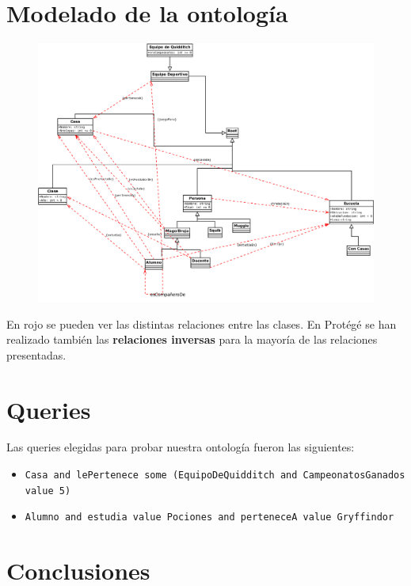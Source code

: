 \documentclass[11pt]{article}
\begin{document}
\newpage

\section{Modelado de la ontología}

\begin{figure}[h!]
    \begin{center}
      \includegraphics[width=\linewidth]{harrypotter.png}
    \end{center}
  \end{figure}

En rojo se pueden ver las distintas relaciones entre las clases. En Protégé se 
han realizado también las \textbf{relaciones inversas} para la mayoría de las 
relaciones presentadas.

\section{Queries}

Las queries elegidas para probar nuestra ontología fueron las siguientes:

\begin{itemize}
    \item \texttt{Casa and lePertenece some (EquipoDeQuidditch and CampeonatosGanados value 5)}
    \item \texttt{Alumno and estudia value Pociones and perteneceA value Gryffindor}
\end{itemize}

\section{Conclusiones}
\end{document}
